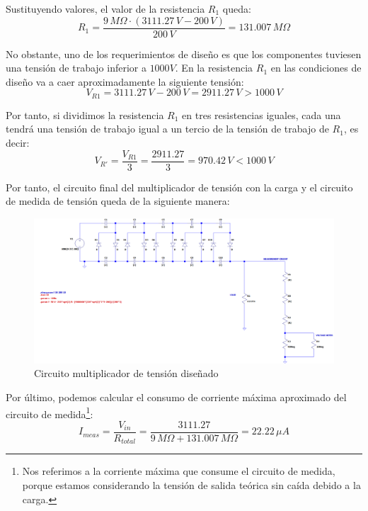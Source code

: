 Sustituyendo valores, el valor de la resistencia $R_1$ queda:
\begin{equation}
    R_1 = \frac{9\,M\Omega\cdot(3111.27\,V-200\,V)}{200\,V} = 131.007\,M\Omega
\end{equation}

No obstante, uno de los requerimientos de diseño es que los componentes tuviesen una tensión de trabajo 
inferior a $1000V$. En la resistencia $R_1$ en las condiciones de diseño va a caer aproximadamente la siguiente tensión:
\begin{equation}
    V_{R1} = 3111.27\,V-200\,V = 2911.27\,V > 1000\,V
\end{equation}

Por tanto, si dividimos la resistencia $R_1$ en tres resistencias iguales, cada una tendrá una 
tensión de trabajo igual a un tercio de la tensión de trabajo de $R_1$, es decir:
\begin{equation}
    V_{R'} = \frac{V_{R1}}{3} = \frac{2911.27}{3} = 970.42\,V < 1000\,V
\end{equation}

Por tanto, el circuito final del multiplicador de tensión con la carga y el circuito de medida 
de tensión queda de la siguiente manera:
\begin{figure}[H]
    \centering
    \includegraphics[width=1\textwidth]{img/circ_final.png}
    \caption{Circuito multiplicador de tensión diseñado}
    \label{fig:esquema_final}
\end{figure}

Por último, podemos calcular el consumo de corriente máxima aproximado del circuito de medida\footnote{Nos referimos 
a la corriente máxima que consume el circuito de medida, porque estamos considerando la tensión 
de salida teórica sin caída debido a la carga.}:
\begin{equation}
    I_{meas} = \frac{V_{in}}{R_{total}} = \frac{3111.27}{9\,M\Omega+131.007\,M\Omega} = 22.22\,\mu A
\end{equation}